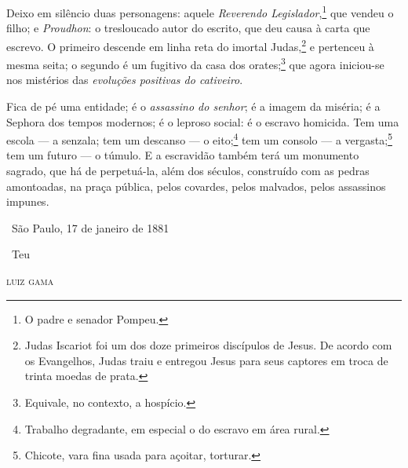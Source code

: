 \asterisc

Deixo em silêncio duas personagens: aquele \emph{Reverendo
Legislador},\footnote{O padre e senador Pompeu.} que vendeu o filho; e
\emph{Proudhon}: o tresloucado autor do escrito, que deu causa à carta
que escrevo. O primeiro descende em linha reta do imortal
Judas,\footnote{Judas Iscariot foi um dos doze primeiros discípulos de \label{judas}
  Jesus. De acordo com os Evangelhos, Judas traiu e entregou Jesus para
  seus captores em troca de trinta moedas de prata.} e pertenceu à
mesma seita; o segundo é um fugitivo da casa dos orates;\footnote{
  Equivale, no contexto, a hospício.} que agora iniciou-se nos
mistérios das \emph{evoluções positivas do cativeiro}.

Fica de pé uma entidade; é o \emph{assassino do senhor}; é a imagem da
miséria; é a Sephora dos tempos modernos; é o leproso social: é o
escravo homicida. Tem uma escola --- a senzala; tem um descanso --- o
eito;\footnote{Trabalho degradante, em especial o do
  escravo em área rural.} tem um consolo --- a vergasta;\footnote{
  Chicote, vara fina usada para açoitar, torturar.}
tem um futuro --- o
túmulo. E a escravidão também terá um monumento sagrado, que há de
perpetuá-la, além dos séculos, construído com as pedras amontoadas, na
praça pública, pelos covardes, pelos malvados, pelos assassinos impunes.

\hfill\ São Paulo, 17 de janeiro de 1881

\hfill\ Teu

\hfill\textsc{luiz gama}


